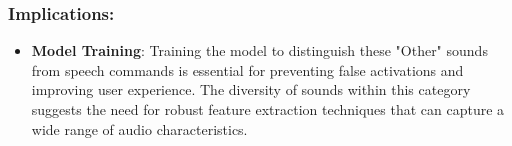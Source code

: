 \subsubsection{Implications:}

\begin{itemize}
    \item \textbf{Model Training}: Training the model to distinguish these "Other" sounds from speech commands is essential for preventing false activations and improving user experience. The diversity of sounds within this category suggests the need for robust feature extraction techniques that can capture a wide range of audio characteristics.
\end{itemize}
